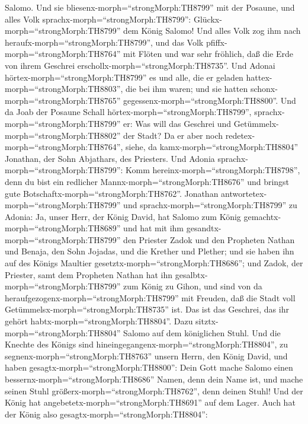Salomo. Und sie bliesenx-morph=``strongMorph:TH8799'' mit der Posaune,
und alles Volk sprachx-morph=``strongMorph:TH8799'':
Glückx-morph=``strongMorph:TH8799'' dem König Salomo!  Und
alles Volk zog ihm nach heraufx-morph=``strongMorph:TH8799'', und das
Volk pfiffx-morph=``strongMorph:TH8764'' mit Flöten und war sehr
fröhlich, daß die Erde von ihrem Geschrei
erschollx-morph=``strongMorph:TH8735''.  Und Adonai
hörtex-morph=``strongMorph:TH8799'' es und alle, die er geladen
hattex-morph=``strongMorph:TH8803'', die bei ihm waren; und sie hatten
schonx-morph=``strongMorph:TH8765''
gegessenx-morph=``strongMorph:TH8800''. Und da Joab der Posaune Schall
hörtex-morph=``strongMorph:TH8799'',
sprachx-morph=``strongMorph:TH8799'' er: Was will das Geschrei und
Getümmelx-morph=``strongMorph:TH8802'' der Stadt?  Da er
aber noch redetex-morph=``strongMorph:TH8764'', siehe, da
kamx-morph=``strongMorph:TH8804'' Jonathan, der Sohn Abjathars, des
Priesters. Und Adonia sprachx-morph=``strongMorph:TH8799'': Komm
hereinx-morph=``strongMorph:TH8798'', denn du bist ein redlicher
Mannx-morph=``strongMorph:TH8676'' und bringst gute
Botschaftx-morph=``strongMorph:TH8762''.  Jonathan
antwortetex-morph=``strongMorph:TH8799'' und
sprachx-morph=``strongMorph:TH8799'' zu Adonia: Ja, unser Herr, der
König David, hat Salomo zum König gemachtx-morph=``strongMorph:TH8689''
 und hat mit ihm gesandtx-morph=``strongMorph:TH8799'' den
Priester Zadok und den Propheten Nathan und Benaja, den Sohn Jojadas,
und die Krether und Plether; und sie haben ihn auf des Königs Maultier
gesetztx-morph=``strongMorph:TH8686'';  und Zadok, der
Priester, samt dem Propheten Nathan hat ihn
gesalbtx-morph=``strongMorph:TH8799'' zum König zu Gihon, und sind von
da heraufgezogenx-morph=``strongMorph:TH8799'' mit Freuden, daß die
Stadt voll Getümmelsx-morph=``strongMorph:TH8735'' ist. Das ist das
Geschrei, das ihr gehört habtx-morph=``strongMorph:TH8804''.
 Dazu sitztx-morph=``strongMorph:TH8804'' Salomo auf dem
königlichen Stuhl.  Und die Knechte des Königs sind
hineingegangenx-morph=``strongMorph:TH8804'', zu
segnenx-morph=``strongMorph:TH8763'' unsern Herrn, den König David, und
haben gesagtx-morph=``strongMorph:TH8800'': Dein Gott mache Salomo einen
bessernx-morph=``strongMorph:TH8686'' Namen, denn dein Name ist, und
mache seinen Stuhl größerx-morph=``strongMorph:TH8762'', denn deinen
Stuhl! Und der König hat angebetetx-morph=``strongMorph:TH8691'' auf dem
Lager.  Auch hat der König also
gesagtx-morph=``strongMorph:TH8804'':
